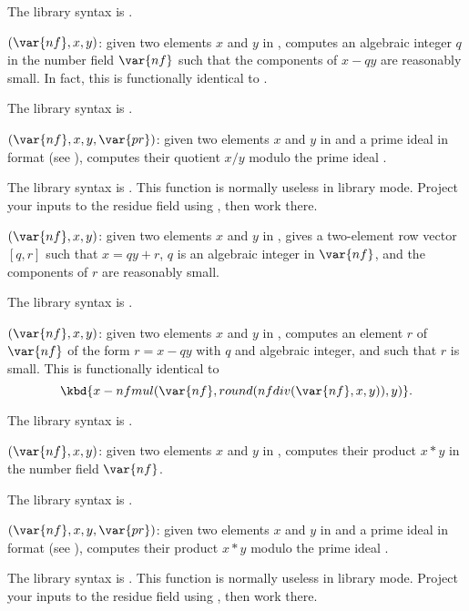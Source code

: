 The library syntax is .

$(\var{nf},x,y)$: \label{se:nfeltdiveuc}given two elements $x$ and $y$ in
, computes an algebraic integer $q$ in the number field $\var{nf}$
such that the components of $x-qy$ are reasonably small. In fact, this is
functionally identical to .

The library syntax is .

$(\var{nf},x,y,\var{pr})$: \label{se:nfeltdivmodpr}given two elements $x$
and $y$ in  and  a prime ideal in  format (see
), computes their quotient $x / y$ modulo the prime ideal
.

The library syntax is .
This function is normally useless in library mode. Project your
inputs to the residue field using , then work there.

$(\var{nf},x,y)$: \label{se:nfeltdivrem}given two elements $x$ and $y$ in
, gives a two-element row vector $[q,r]$ such that $x=qy+r$, $q$ is
an algebraic integer in $\var{nf}$, and the components of $r$ are
reasonably small.

The library syntax is .

$(\var{nf},x,y)$: \label{se:nfeltmod}
given two elements $x$ and $y$ in
, computes an element $r$ of $\var{nf}$ of the form $r=x-qy$ with
$q$ and algebraic integer, and such that $r$ is small. This is functionally
identical to
$$\kbd{x - nfmul(\var{nf},round(nfdiv(\var{nf},x,y)),y)}.$$

The library syntax is .

$(\var{nf},x,y)$: \label{se:nfeltmul}
given two elements $x$ and $y$ in
, computes their product $x*y$ in the number field $\var{nf}$.

The library syntax is .

$(\var{nf},x,y,\var{pr})$: \label{se:nfeltmulmodpr}given two elements $x$ and
$y$ in  and  a prime ideal in  format (see
), computes their product $x*y$ modulo the prime ideal
.

The library syntax is .
This function is normally useless in library mode. Project your
inputs to the residue field using , then work there.

